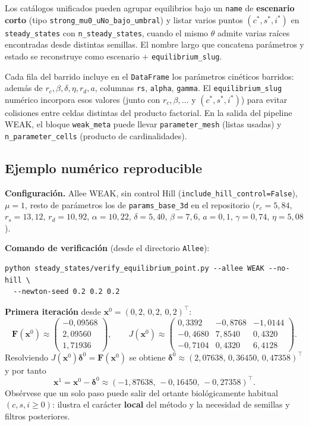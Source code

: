 \documentclass[11pt,a4paper]{article}
\begin{document}
Los catálogos unificados pueden agrupar equilibrios bajo un \texttt{name} de \textbf{escenario corto} (tipo \texttt{strong\_mu0\_uNo\_bajo\_umbral}) y listar varios puntos $(c^\ast,s^\ast,i^\ast)$ en \texttt{steady\_states} con \texttt{n\_steady\_states}, cuando el mismo $\theta$ admite varias raíces encontradas desde distintas semillas. El nombre largo que concatena parámetros y estado se reconstruye como escenario + \texttt{equilibrium\_slug}.

Cada fila del barrido incluye en el \texttt{DataFrame} los parámetros cinéticos barridos: además de $r_c,\beta,\delta,\eta,r_d,a$, columnas \texttt{rs}, \texttt{alpha}, \texttt{gamma}. El \texttt{equilibrium\_slug} numérico incorpora esos valores (junto con $r_c,\beta,\ldots$ y $(c^\ast,s^\ast,i^\ast)$) para evitar colisiones entre celdas distintas del producto factorial. En la salida del pipeline WEAK, el bloque \texttt{weak\_meta} puede llevar \texttt{parameter\_mesh} (listas usadas) y \texttt{n\_parameter\_cells} (producto de cardinalidades).

\subsection{Ejemplo numérico reproducible}

\textbf{Configuración.} Allee WEAK, sin control Hill (\texttt{include\_hill\_control=False}), $\mu=1$, resto de parámetros los de \texttt{params\_base\_3d} en el repositorio ($r_c=5{,}84$, $r_s=13{,}12$, $r_d=10{,}92$, $\alpha=10{,}22$, $\delta=5{,}40$, $\beta=7{,}6$, $a=0{,}1$, $\gamma=0{,}74$, $\eta=5{,}08$).

\textbf{Comando de verificación} (desde el directorio \texttt{Allee}):
\begin{verbatim}
python steady_states/verify_equilibrium_point.py --allee WEAK --no-hill \
  --newton-seed 0.2 0.2 0.2
\end{verbatim}

\textbf{Primera iteración} desde $\mathbf{x}^0=(0{,}2,\,0{,}2,\,0{,}2)^\top$:
\[
\mathbf{F}(\mathbf{x}^0)\approx \begin{pmatrix} -0{,}09568 \\ 2{,}09560 \\ 1{,}71936 \end{pmatrix},\qquad
J(\mathbf{x}^0)\approx \begin{pmatrix}
 0{,}3392 & -0{,}8768 & -1{,}0144 \\
-0{,}4680 &  7{,}8540 &  0{,}4320 \\
-0{,}7104 &  0{,}4320 &  6{,}4128
\end{pmatrix}.
\]
Resolviendo $J(\mathbf{x}^0)\boldsymbol{\delta}^0=\mathbf{F}(\mathbf{x}^0)$ se obtiene $\boldsymbol{\delta}^0\approx(2{,}07638,\,0{,}36450,\,0{,}47358)^\top$ y por tanto
\[
\mathbf{x}^1=\mathbf{x}^0-\boldsymbol{\delta}^0\approx (-1{,}87638,\,-0{,}16450,\,-0{,}27358)^\top.
\]
Obsérvese que un solo paso puede salir del ortante biológicamente habitual $(c,s,i\ge 0)$: ilustra el carácter \textbf{local} del método y la necesidad de semillas y filtros posteriores.
\end{document}
